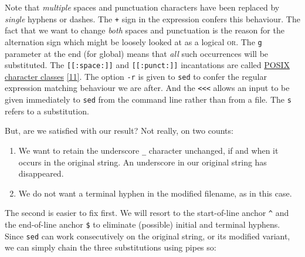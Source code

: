 \documentclass[
  a4paper,
]{article}
\newenvironment{Shaded}{\begin{snugshade}}{\end{snugshade}}
\newcommand{\AttributeTok}[1]{\textcolor[rgb]{0.80,0.80,0.80}{#1}}
\newcommand{\DataTypeTok}[1]{\textcolor[rgb]{0.87,0.87,0.75}{#1}}
\newcommand{\FunctionTok}[1]{\textcolor[rgb]{0.94,0.94,0.56}{#1}}
\newcommand{\KeywordTok}[1]{\textcolor[rgb]{0.94,0.87,0.69}{#1}}
\newcommand{\OperatorTok}[1]{\textcolor[rgb]{0.94,0.94,0.82}{#1}}
\newcommand{\StringTok}[1]{\textcolor[rgb]{0.80,0.58,0.58}{#1}}
\providecommand{\tightlist}{%
  \setlength{\itemsep}{0pt}\setlength{\parskip}{0pt}}
\begin{document}
Note that \emph{multiple} spaces and punctuation characters have been
replaced by \emph{single} hyphens or dashes. The \texttt{+} sign in the
expression confers this behaviour. The fact that we want to change
\emph{both} spaces and punctuation is the reason for the
\texttt{\textbar{}} alternation sign which might be loosely looked at as
a logical \textsc{or}. The \texttt{g} parameter at the end (for global)
means that \emph{all} such occurrences will be substituted. The
\texttt{{[}{[}:space:{]}{]}} and \texttt{{[}{[}:punct:{]}{]}}
incantations are called
\href{https://www.regular-expressions.info/posixbrackets.html}{POSIX
character classes} \protect\hyperlink{ref-posixcharclass}{{[}11{]}}. The
option \texttt{-r} is given to \texttt{sed} to confer the regular
expression matching behaviour we are after. And the
\texttt{\textless{}\textless{}\textless{}} allows an input to be given
immediately to \texttt{sed} from the command line rather than from a
file. The \texttt{s} refers to a substitution.

But, are we satisfied with our result? Not really, on two counts:

\begin{enumerate}
\tightlist
\item
  We want to retain the underscore \texttt{\_} character unchanged, if
  and when it occurs in the original string. An underscore in our
  original string has disappeared.
\item
  We do not want a terminal hyphen in the modified filename, as in this
  case.
\end{enumerate}

The second is easier to fix first. We will resort to the start-of-line
anchor \texttt{\^{}} and the end-of-line anchor \texttt{\$} to eliminate
(possible) initial and terminal hyphens. Since \texttt{sed} can work
consecutively on the original string, or its modified variant, we can
simply chain the three substitutions using pipes so:

\begin{Shaded}
\end{Shaded}
\end{document}
